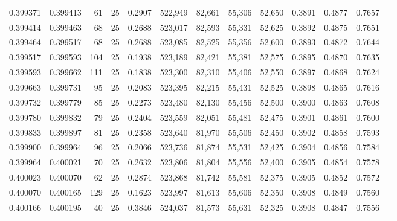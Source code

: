 \begin{tabular}{rrrrrrrrrrrrr}
0.399371 & 0.399413 &    61 &  25 &                                     0.2907 & 522,949 &  82,661 &  55,306 &  52,650 & 0.3891 & 0.4877 & 0.7657 \\
0.399414 & 0.399463 &    68 &  25 &                                     0.2688 & 523,017 &  82,593 &  55,331 &  52,625 & 0.3892 & 0.4875 & 0.7651 \\
0.399464 & 0.399517 &    68 &  25 &                                     0.2688 & 523,085 &  82,525 &  55,356 &  52,600 & 0.3893 & 0.4872 & 0.7644 \\
0.399517 & 0.399593 &   104 &  25 &                                     0.1938 & 523,189 &  82,421 &  55,381 &  52,575 & 0.3895 & 0.4870 & 0.7635 \\
0.399593 & 0.399662 &   111 &  25 &                                     0.1838 & 523,300 &  82,310 &  55,406 &  52,550 & 0.3897 & 0.4868 & 0.7624 \\
0.399663 & 0.399731 &    95 &  25 &                                     0.2083 & 523,395 &  82,215 &  55,431 &  52,525 & 0.3898 & 0.4865 & 0.7616 \\
0.399732 & 0.399779 &    85 &  25 &                                     0.2273 & 523,480 &  82,130 &  55,456 &  52,500 & 0.3900 & 0.4863 & 0.7608 \\
0.399780 & 0.399832 &    79 &  25 &                                     0.2404 & 523,559 &  82,051 &  55,481 &  52,475 & 0.3901 & 0.4861 & 0.7600 \\
0.399833 & 0.399897 &    81 &  25 &                                     0.2358 & 523,640 &  81,970 &  55,506 &  52,450 & 0.3902 & 0.4858 & 0.7593 \\
0.399900 & 0.399964 &    96 &  25 &                                     0.2066 & 523,736 &  81,874 &  55,531 &  52,425 & 0.3904 & 0.4856 & 0.7584 \\
0.399964 & 0.400021 &    70 &  25 &                                     0.2632 & 523,806 &  81,804 &  55,556 &  52,400 & 0.3905 & 0.4854 & 0.7578 \\
0.400023 & 0.400070 &    62 &  25 &                                     0.2874 & 523,868 &  81,742 &  55,581 &  52,375 & 0.3905 & 0.4852 & 0.7572 \\
0.400070 & 0.400165 &   129 &  25 &                                     0.1623 & 523,997 &  81,613 &  55,606 &  52,350 & 0.3908 & 0.4849 & 0.7560 \\
0.400166 & 0.400195 &    40 &  25 &                                     0.3846 & 524,037 &  81,573 &  55,631 &  52,325 & 0.3908 & 0.4847 & 0.7556 \\

\end{tabular}
